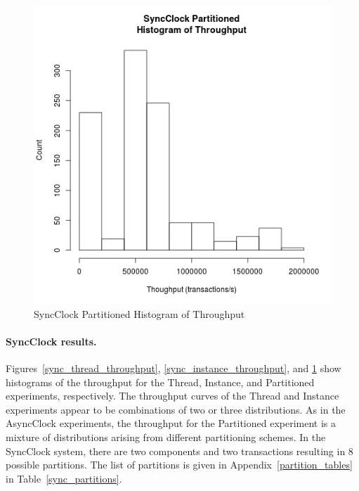 \begin{figure}[H]
\center
\includegraphics[height=.4\textheight]{sync_partitioned_throughput_hist.png}
\caption{SyncClock Partitioned Histogram of Throughput}
\label{sync_partitioned_throughput}
\end{figure}

\paragraph{SyncClock results.}
Figures~\ref{sync_thread_throughput}, \ref{sync_instance_throughput}, and \ref{sync_partitioned_throughput} show histograms of the throughput for the Thread, Instance, and Partitioned experiments, respectively.
The throughput curves of the Thread and Instance experiments appear to be combinations of two or three distributions.
As in the AsyncClock experiments, the throughput for the Partitioned experiment is a mixture of distributions arising from different partitioning schemes.
In the SyncClock system, there are two components and two transactions resulting in 8 possible partitions.
The list of partitions is given in Appendix~\ref{partition_tables} in Table~\ref{sync_partitions}.

